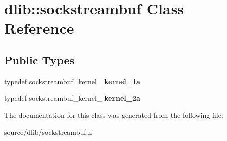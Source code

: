 \hypertarget{classdlib_1_1sockstreambuf}{
\section{dlib::sockstreambuf Class Reference}
\label{classdlib_1_1sockstreambuf}
}
\subsection*{Public Types}
\begin{DoxyCompactItemize}
\item 
\hypertarget{classdlib_1_1sockstreambuf_ac36734b860aee1792252254031511754}{
typedef sockstreambuf\_\-kernel\_ {\bfseries kernel\_\-1a}}
\label{classdlib_1_1sockstreambuf_ac36734b860aee1792252254031511754}

\item 
\hypertarget{classdlib_1_1sockstreambuf_a67192a7a46bb4ef795d401c066b08f44}{
typedef sockstreambuf\_\-kernel\_ {\bfseries kernel\_\-2a}}
\label{classdlib_1_1sockstreambuf_a67192a7a46bb4ef795d401c066b08f44}

\end{DoxyCompactItemize}


The documentation for this class was generated from the following file:\begin{DoxyCompactItemize}
\item 
source/dlib/sockstreambuf.h\end{DoxyCompactItemize}
